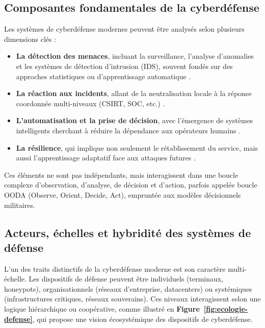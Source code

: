 \documentclass[ twoside,openright,titlepage,numbers=noenddot,headinclude,%
                footinclude=true,cleardoublepage=empty,abstractoff, %
                BCOR=5mm,paper=a4,fontsize=11pt,%
                french,american,%
                ]{scrreprt}
\begin{document}
\subsection*{Composantes fondamentales de la cyberdéfense}

Les systèmes de cyberdéfense modernes peuvent être analysés selon plusieurs dimensions clés :

\begin{itemize}
    \item \textbf{La détection des menaces}, incluant la surveillance, l'analyse d'anomalies et les systèmes de détection d'intrusion (IDS), souvent fondés sur des approches statistiques ou d'apprentissage automatique \cite{sommer2010outside}.

    \item \textbf{La réaction aux incidents}, allant de la neutralisation locale à la réponse coordonnée multi-niveaux (CSIRT, SOC, etc.) \cite{parsons2016managing}.

    \item \textbf{L'automatisation et la prise de décision}, avec l'émergence de systèmes intelligents cherchant à réduire la dépendance aux opérateurs humains \cite{kim2018survey, wood2018taxonomy}.

    \item \textbf{La résilience}, qui implique non seulement le rétablissement du service, mais aussi l'apprentissage adaptatif face aux attaques futures \cite{kozlowski2013emergence, cashell2004cyber}.
\end{itemize}

Ces éléments ne sont pas indépendants, mais interagissent dans une boucle complexe d'observation, d'analyse, de décision et d'action, parfois appelée boucle OODA (Observe, Orient, Decide, Act), empruntée aux modèles décisionnels militaires.

\subsection*{Acteurs, échelles et hybridité des systèmes de défense}

L'un des traits distinctifs de la cyberdéfense moderne est son caractère multi-échelle. Les dispositifs de défense peuvent être individuels (terminaux, honeypots), organisationnels (réseaux d'entreprise, datacenters) ou systémiques (infrastructures critiques, réseaux souverains). Ces niveaux interagissent selon une logique hiérarchique ou coopérative, comme illustré en \textbf{Figure~\ref{fig:ecologie-defense}}, qui propose une vision écosystémique des dispositifs de cyberdéfense.
\end{document}
